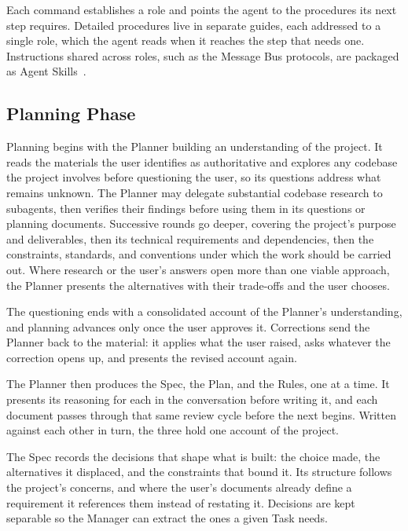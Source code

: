 Each command establishes a role and points the agent to the procedures its next step requires. Detailed procedures live in separate guides, each addressed to a single role, which the agent reads when it reaches the step that needs one. Instructions shared across roles, such as the Message Bus protocols, are packaged as Agent Skills~\cite{agentskills2026overview}.

\subsection{Planning Phase}
\label{sec:framework-design-planning-phase}

Planning begins with the Planner building an understanding of the project. It reads the materials the user identifies as authoritative and explores any codebase the project involves before questioning the user, so its questions address what remains unknown. The Planner may delegate substantial codebase research to subagents, then verifies their findings before using them in its questions or planning documents. Successive rounds go deeper, covering the project's purpose and deliverables, then its technical requirements and dependencies, then the constraints, standards, and conventions under which the work should be carried out. Where research or the user's answers open more than one viable approach, the Planner presents the alternatives with their trade-offs and the user chooses.

The questioning ends with a consolidated account of the Planner's understanding, and planning advances only once the user approves it. Corrections send the Planner back to the material: it applies what the user raised, asks whatever the correction opens up, and presents the revised account again.

The Planner then produces the Spec, the Plan, and the Rules, one at a time. It presents its reasoning for each in the conversation before writing it, and each document passes through that same review cycle before the next begins. Written against each other in turn, the three hold one account of the project.

The Spec records the decisions that shape what is built: the choice made, the alternatives it displaced, and the constraints that bound it. Its structure follows the project's concerns, and where the user's documents already define a requirement it references them instead of restating it. Decisions are kept separable so the Manager can extract the ones a given Task needs.

